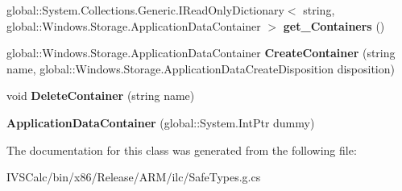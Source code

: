 \begin{DoxyCompactItemize}
\item 
\mbox{\label{class_windows_1_1_storage_1_1_application_data_container_a361c8478595cda5b8019768201c65b27}} 
global\+::\+System.\+Collections.\+Generic.\+I\+Read\+Only\+Dictionary$<$ string, global\+::\+Windows.\+Storage.\+Application\+Data\+Container $>$ {\bfseries get\+\_\+\+Containers} ()
\item 
\mbox{\label{class_windows_1_1_storage_1_1_application_data_container_ad7aefe4a6e2c696f8ac1044c1649ab0a}} 
global\+::\+Windows.\+Storage.\+Application\+Data\+Container {\bfseries Create\+Container} (string name, global\+::\+Windows.\+Storage.\+Application\+Data\+Create\+Disposition disposition)
\item 
\mbox{\label{class_windows_1_1_storage_1_1_application_data_container_ae10280581ba75a8732781e66d0037ef0}} 
void {\bfseries Delete\+Container} (string name)
\item 
\mbox{\label{class_windows_1_1_storage_1_1_application_data_container_a0649013a245656d416ecc5a7f192010b}} 
{\bfseries Application\+Data\+Container} (global\+::\+System.\+Int\+Ptr dummy)
\end{DoxyCompactItemize}


The documentation for this class was generated from the following file\+:\begin{DoxyCompactItemize}
\item 
I\+V\+S\+Calc/bin/x86/\+Release/\+A\+R\+M/ilc/Safe\+Types.\+g.\+cs\end{DoxyCompactItemize}
